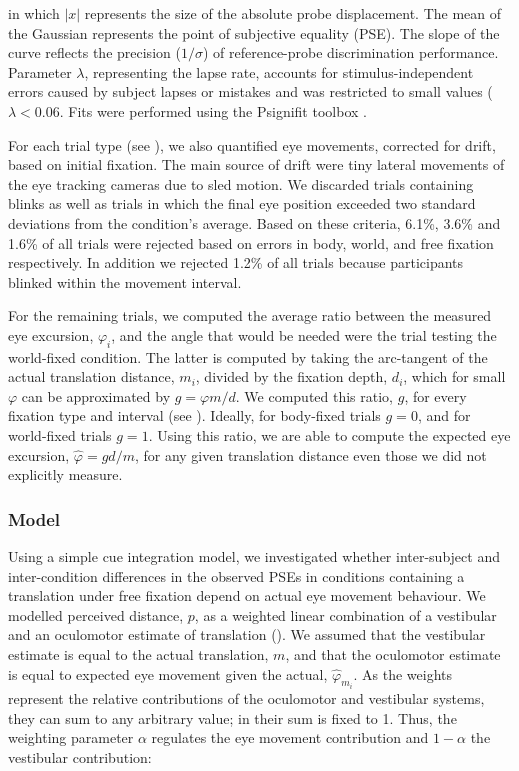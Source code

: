 in which $|x|$ represents the size of the absolute probe displacement. The mean of the Gaussian represents the point of subjective equality (PSE). The slope of the curve reflects the precision ($1/\sigma$) of reference-probe discrimination performance. Parameter $\lambda$, representing the lapse rate, accounts for stimulus-independent errors caused by subject lapses or mistakes and was restricted to small values ($\lambda < 0.06$. Fits were performed using the Psignifit toolbox \cite{wichmann2001,wichmann2001b}.

For each trial type (see ), we also quantified eye movements, corrected for drift, based on initial fixation. The main source of drift were tiny lateral movements of the eye tracking cameras due to sled motion. We discarded trials containing blinks as well as trials in which the final eye position exceeded two standard deviations from the condition's average. Based on these criteria, 6.1\%, 3.6\% and 1.6\% of all trials were rejected based on errors in body, world, and free fixation respectively. In addition we rejected 1.2\% of all trials because participants blinked within the movement interval.

For the remaining trials, we computed the average ratio between the measured eye excursion, $\varphi_i$, and the angle that would be needed were the trial testing the world-fixed condition. The latter is computed by taking the arc-tangent of the actual translation distance, $m_i$, divided by the fixation depth, $d_i$, which for small $\varphi$ can be approximated by $g = \varphi m/d$. We computed this ratio, $g$, for every fixation type and interval (see ). Ideally, for body-fixed trials $g = 0$, and for world-fixed trials $g = 1$. Using this ratio, we are able to compute the expected eye excursion, $\hat{\varphi} = gd/m$, for any given translation distance even those we did not explicitly measure.

\subsubsection{Model}
\label{p3:sec:model}

Using a simple cue integration model, we investigated whether inter-subject and inter-condition differences in the observed PSEs in conditions containing a translation under free fixation depend on actual eye movement behaviour. We modelled perceived distance, $p$, as a weighted linear combination of a vestibular and an oculomotor estimate of translation (). We assumed that the vestibular estimate is equal to the actual translation, $m$, and that the oculomotor estimate is equal to expected eye movement given the  actual, $\hat{\varphi}_{m_i}$. As the weights represent the relative contributions of the oculomotor and vestibular systems, they can sum to any arbitrary value; in  their sum is fixed to 1. Thus, the weighting parameter $\alpha$ regulates the eye movement contribution and $1 - \alpha$  the vestibular contribution:

